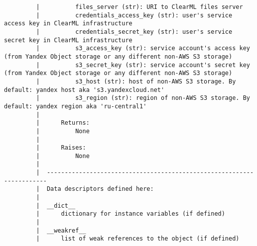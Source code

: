 \begin{lstlisting}
		 |          files_server (str): URI to ClearML files server
		 |          credentials_access_key (str): user's service access key in ClearML infrastructure
		 |          credentials_secret_key (str): user's service secret key in ClearML infrastructure
		 |          s3_access_key (str): service account's access key (from Yandex Object storage or any different non-AWS S3 storage)
		 |          s3_secret_key (str): service account's secret key (from Yandex Object storage or any different non-AWS S3 storage)
		 |          s3_host (str): host of non-AWS S3 storage. By default: yandex host aka 's3.yandexcloud.net'
		 |          s3_region (str): region of non-AWS S3 storage. By default: yandex region aka 'ru-central1'
		 |      
		 |      Returns:
		 |          None
		 |      
		 |      Raises:
		 |          None
		 |  
		 |  ----------------------------------------------------------------------
		 |  Data descriptors defined here:
		 |  
		 |  __dict__
		 |      dictionary for instance variables (if defined)
		 |  
		 |  __weakref__
		 |      list of weak references to the object (if defined)
		

\end{lstlisting}
